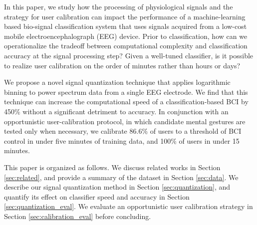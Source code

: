 
In this paper, we study how the processing of physiological signals and the strategy for user calibration can impact the performance of a machine-learning based bio-signal classification system that uses signals acquired from a low-cost mobile electroencephalograph (EEG) device. Prior to classification, how can we operationalize the tradeoff between computational complexity and classification accuracy at the signal processing step? Given a well-tuned classifier, is it possible to realize user calibration on the order of minutes rather than hours or days?


We propose a novel signal quantization technique that applies logarithmic binning to power spectrum data from a single EEG electrode. We find that this technique can increase the computational speed of a classification-based BCI by 450\% without a significant detriment to accuracy. In conjunction with an opportunistic user-calibration protocol, in which candidate mental gestures are tested only when necessary, we calibrate 86.6\% of users to a threshold of BCI control in under five minutes of training data, and 100\% of users in under 15 minutes. 

This paper is organized as follows. We discuss related works in Section \ref{sec:related}, and provide a summary of the dataset in Section \ref{sec:data}. We describe our signal quantization method in Section \ref{sec:quantization}, and quantify its effect on classifier speed and accuracy in Section \ref{sec:quantization_eval}. We evaluate an opportunistic user calibration strategy in Section \ref{sec:calibration_eval} before concluding.
